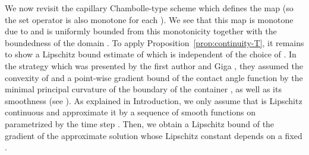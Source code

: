 \documentclass[11pt]{article}
\makeatletter
\numberwithin{equation}{section}
\newcommand{\pOmega}[0]{\partial\Omega}
\newcounter{mathrecordid}
\newcommand{\mathboxbegin}[1]{%
  \stepcounter{mathrecordid}%
  \immediate\write\mathrecords{\themathrecordid,#1}%
  \special{pdf:bann << /Type /Annot /Subtype /Link /Border [0 0 0]
    /MathBoxID \themathrecordid /F 2
    /A << /S /URI /URI (urn:mathbox:\themathrecordid) >> >>}}
\newcommand{\mathboxinlineplain}[1]{$#1$}
\newcommand{\mathboxinline}[1]{%
  $\mathboxbegin{inline}#1\special{pdf:eann}$}
\newcommand{\recordmath}{%
  \ifmeasuring@\expandafter\mathboxinlineplain
  \else\expandafter\mathboxinline\fi}
\makeatother
\begin{document}
We now revisit the capillary Chambolle-type scheme which defines the map \recordmath{E\mapsto w_E^h} (so the set operator \recordmath{T_h} is also monotone for each \recordmath{h>0}).
We see that this map is monotone due to \cite[Lemma 3.1]{EG25} and is uniformly bounded from this monotonicity together with the boundedness of the domain \recordmath{\Omega}.
To apply Proposition~\ref{prop:continuity-T}, it remains to show a Lipschitz bound estimate of \recordmath{w_E} which is independent of the choice of \recordmath{E}.
In the strategy which was presented by the first author and Giga \cite{EG25}, they assumed the convexity of \recordmath{\Omega}
and a point-wise gradient bound of the contact angle function \recordmath{\beta} by the minimal principal curvature of the boundary of 
the container \recordmath{\pOmega}, as well as its smoothness (see \cite[Theorem 3.1]{EG25}).
As explained in Introduction, we only assume that \recordmath{\beta} is Lipschitz continuous and approximate it by a sequence \recordmath{\{\beta^h\}_{h>0}} of smooth functions on \recordmath{\pOmega} parametrized by the time step \recordmath{h>0}. Then, we obtain a Lipschitz bound of the gradient of the approximate solution whose Lipschitz constant depends on a fixed \recordmath{h>0}.
\end{document}
